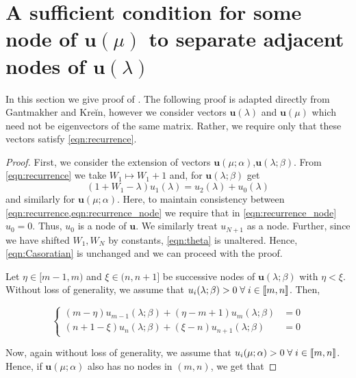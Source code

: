 \appendix

\chapter{A sufficient condition for some node of $\mathbf{u}(\mu)$ to separate adjacent nodes of $\mathbf{u}(\lambda)$}\label{app:Gantmakher}

In this section we give proof of . The following proof is adapted directly from Gantmakher and Kre\u{i}n\cite{gantmakher2002oscillation}, however we consider vectors $\mathbf{u}(\lambda)$ and $\mathbf{u}(\mu)$ which need not be eigenvectors of the same matrix. Rather, we require only that these vectors satisfy \cref{eqn:recurrence}.

    \Gantmakher*

    \begin{proof}
      First, we consider the extension of vectors $\mathbf{u}(\mu;\alpha)$,$\mathbf{u}(\lambda;\beta)$. From \cref{eqn:recurrence}  we take $W_1 \mapsto W_1+1$ and, for $\mathbf{u}(\lambda;\beta)$ get
      \begin{equation}\label{eqn:recurrence_node}
      	\left(1+W_1 - \lambda\right)u_1(\lambda) = u_{2}(\lambda) + u_{0}(\lambda)
      \end{equation}
      and similarly for $\mathbf{u}(\mu;\alpha)$. Here, to maintain consistency between \cref{eqn:recurrence,eqn:recurrence_node} we require that in \cref{eqn:recurrence_node} $u_0=0$. Thus, $u_0$ is a node of $\mathbf{u}$. We similarly treat $u_{N+1}$ as a node. Further, since we have shifted $W_1,W_{N}$ by constants, \cref{eqn:theta} is unaltered. Hence, \cref{eqn:Casoratian} is unchanged and we can proceed with the proof.

      Let $\eta \in [m-1,m)$ and $\xi \in (n,n+1]$ be successive nodes of $\mathbf{u}(\lambda;\beta)$ with $\eta < \xi$. Without loss of generality, we assume that $u_i(\lambda;\beta) > 0 \; \forall \; i \in \left \llbracket m , n \right \rrbracket$. Then,

      \begin{equation}\label{eqn:Appendix_conditional}
	\begin{cases}
	      (m-\eta)u_{m-1}(\lambda;\beta) + (\eta - m + 1)u_{m}(\lambda;\beta) &= 0 \\
	      (n+1-\xi)u_n(\lambda;\beta) + (\xi-n)u_{n+1}(\lambda;\beta) &= 0
	\end{cases}
      \end{equation}

      Now, again without loss of generality, we assume that $u_i(\mu;\alpha) > 0 \; \forall \; i \in \left \llbracket m , n \right \rrbracket$. Hence, if $\mathbf{u}(\mu;\alpha)$ also has no nodes in $(m,n)$, we get that


\end{proof}
